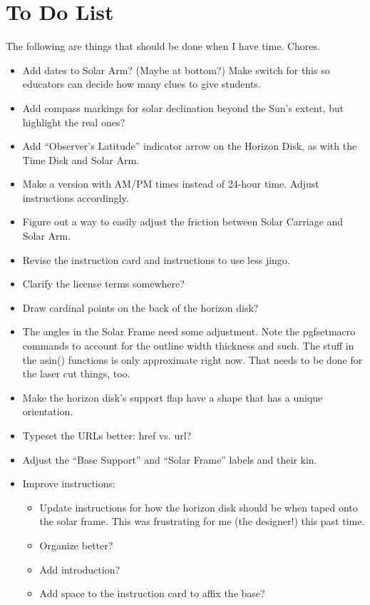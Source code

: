 \documentclass[tikz]{article}
\newif\ifPrintInstructions  %
\newif\ifPrintWishlist  %
\begin{document}
\fi %








\ifPrintWishlist
	\newpage
	
	\section*{To Do List}
	The following are things that should be done when I have time. Chores. 
	\begin{itemize}
		\item Add dates to Solar Arm? (Maybe at bottom?) Make switch for this so educators can decide how many clues to give students.
		\item Add compass markings for solar declination beyond the Sun's extent, but highlight the real ones?
		\item Add ``Observer's Latitude'' indicator arrow on the Horizon Disk, as with the Time Disk and Solar Arm. 
		\item Make a version with AM/PM times instead of 24-hour time. Adjust instructions accordingly. 
		\item Figure out a way to easily adjust the friction between Solar Carriage and Solar Arm. 
		\item Revise the instruction card and instructions to use less jingo. 
		\item Clarify the license terms somewhere?
		\item Draw cardinal points on the back of the horizon disk? 
		\item The angles in the Solar Frame need some adjustment. Note the pgfsetmacro commands to account for the outline width thickness and such. The stuff in the asin() functions is only approximate right now. That needs to be done for the laser cut things, too. 
		\item Make the horizon disk's support flap have a shape that has a unique orientation. 
		\item Typeset the URLs better: href vs. url?
		\item Adjust the ``Base Support'' and ``Solar Frame'' labels and their kin. 
		\item Improve instructions:
		\begin{itemize}
			\item Update instructions for how the horizon disk should be when taped onto the solar frame. This was frustrating for me (the designer!) this past time. 
			\item Organize better? 
			\item Add introduction? 
			\item Add space to the instruction card to affix the base?
		\end{itemize}
	\end{itemize}
\end{document}
